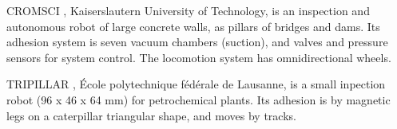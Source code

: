 


CROMSCI%
, Kaiserslautern University of Technology, is an
inspection and autonomous robot of large concrete walls, as
pillars of bridges and dams. Its adhesion system is seven vacuum
chambers (suction), and valves and pressure sensors for system control. The
locomotion system has omnidirectional wheels.



TRIPILLAR%
, École polytechnique fédérale de Lausanne, is a small inpection robot (96 x 46 x 64 mm) for petrochemical plants. Its
adhesion is by magnetic legs on a caterpillar triangular shape, and moves by
tracks.

